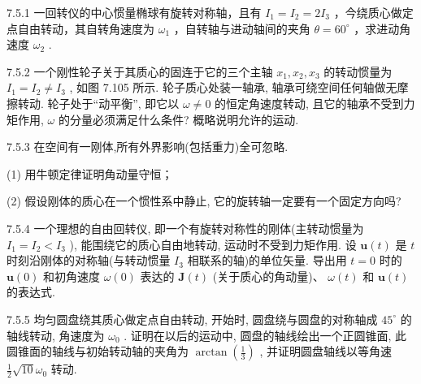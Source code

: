 \begin{problem}{7.5.1}
一回转仪的中心惯量椭球有旋转对称轴，且有 $I_{1} = I_{2} = 2I_{3}$ ，今绕质心做定点自由转动，其自转角速度为 $\omega_{1}$ ，自转轴与进动轴间的夹角 $\theta = 60^{\circ}$ ，求进动角速度 $\omega_{2}$ .
\end{problem}
\clearpage


\begin{problem}{7.5.2}
一个刚性轮子关于其质心的固连于它的三个主轴 $x_{1}, x_{2}, x_{3}$ 的转动惯量为 $I_{1} = I_{2} \neq I_{3}$ , 如图 7.105 所示. 轮子质心处装一轴承, 轴承可绕空间任何轴做无摩擦转动. 轮子处于“动平衡”, 即它以 $\omega \neq 0$ 的恒定角速度转动, 且它的轴承不受到力矩作用, $\omega$ 的分量必须满足什么条件? 概略说明允许的运动.
\begin{center}

\end{center}
\end{problem}
\clearpage


\begin{problem}{7.5.3}
在空间有一刚体,所有外界影响(包括重力)全可忽略.

(1) 用牛顿定律证明角动量守恒；

(2) 假设刚体的质心在一个惯性系中静止, 它的旋转轴一定要有一个固定方向吗?
\end{problem}
\clearpage


\begin{problem}{7.5.4}
一个理想的自由回转仪, 即一个有旋转对称性的刚体(主转动惯量为 $I_{1} = I_{2} < I_{3}$ ), 能围绕它的质心自由地转动, 运动时不受到力矩作用. 设 $\bm{u}(t)$ 是 $t$ 时刻沿刚体的对称轴(与转动惯量 $I_{3}$ 相联系的轴)的单位矢量. 导出用 $t = 0$ 时的 $\bm{u}(0)$ 和初角速度 $\omega(0)$ 表达的 $\bm{J}(t)$ (关于质心的角动量)、 $\omega(t)$ 和 $\bm{u}(t)$ 的表达式.
\begin{center}

\end{center}
\end{problem}
\clearpage


\begin{problem}{7.5.5}
均匀圆盘绕其质心做定点自由转动, 开始时, 圆盘绕与圆盘的对称轴成 $45^{\circ}$ 的轴线转动, 角速度为 $\omega_0$ . 证明在以后的运动中, 圆盘的轴线绘出一个正圆锥面, 此圆锥面的轴线与初始转动轴的夹角为 $\arctan\left(\frac{1}{3}\right)$ , 并证明圆盘轴线以等角速 $\frac{1}{2}\sqrt{10}\omega_0$ 转动.
\begin{center}

\end{center}
\end{problem}
\clearpage


